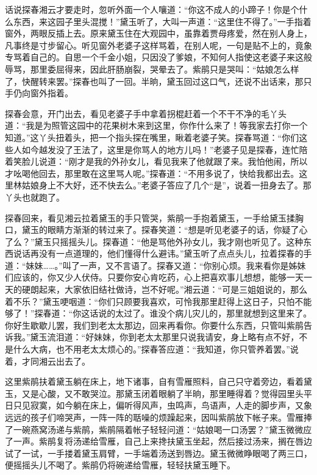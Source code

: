 


\begin{parag}
    话说探春湘云才要走时，忽听外面一个人嚷道：“你这不成人的小蹄子！你是个什么东西，来这园子里头混搅！”黛玉听了，大叫一声道：“这里住不得了。”一手指着窗外，两眼反插上去。原来黛玉住在大观园中，虽靠着贾母疼爱，然在别人身上，凡事终是寸步留心。听见窗外老婆子这样骂着，在别人呢，一句是贴不上的，竟象专骂着自己的。自思一个千金小姐，只因没了爹娘，不知何人指使这老婆子来这般辱骂，那里委屈得来，因此肝肠崩裂，哭晕去了。紫鹃只是哭叫：“姑娘怎么样了，快醒转来罢。”探春也叫了一回。半晌，黛玉回过这口气，还说不出话来，那只手仍向窗外指着。
\end{parag}


\begin{parag}
    探春会意，开门出去，看见老婆子手中拿着拐棍赶着一个不干不净的毛丫头道：“我是为照管这园中的花果树木来到这里，你作什么来了！等我家去打你一个知道。”这丫头扭着头，把一个指头探在嘴里，瞅着老婆子笑。探春骂道：“你们这些人如今越发没了王法了，这里是你骂人的地方儿吗！”老婆子见是探春，连忙陪着笑脸儿说道：“刚才是我的外孙女儿，看见我来了他就跟了来。我怕他闹，所以才吆喝他回去，那里敢在这里骂人呢。”探春道：“不用多说了，快给我都出去。这里林姑娘身上不大好，还不快去么。”老婆子答应了几个“是”，说着一扭身去了。那丫头也就跑了。
\end{parag}


\begin{parag}
    探春回来，看见湘云拉着黛玉的手只管哭，紫鹃一手抱着黛玉，一手给黛玉揉胸口，黛玉的眼睛方渐渐的转过来了。探春笑道：“想是听见老婆子的话，你疑了心了么？”黛玉只摇摇头儿。探春道：“他是骂他外孙女儿，我才刚也听见了。这种东西说话再没有一点道理的，他们懂得什么避讳。”黛玉听了点点头儿，拉着探春的手道：“妹妹……。”叫了一声，又不言语了。探春又道：“你别心烦。我来看你是姊妹们应该的，你又少人伏侍。只要你安心肯吃药，心上把喜欢事儿想想，能够一天一天的硬朗起来，大家依旧结社做诗，岂不好呢。”湘云道：“可是三姐姐说的，那么着不乐？”黛玉哽咽道：“你们只顾要我喜欢，可怜我那里赶得上这日子，只怕不能够了！”探春道：“你这话说的太过了。谁没个病儿灾儿的，那里就想到这里来了。你好生歇歇儿罢，我们到老太太那边，回来再看你。你要什么东西，只管叫紫鹃告诉我。”黛玉流泪道：“好妹妹，你到老太太那里只说我请安，身上略有点不好，不是什么大病，也不用老太太烦心的。”探春答应道：“我知道，你只管养着罢。”说着，才同湘云出去了。
\end{parag}


\begin{parag}
    这里紫鹃扶着黛玉躺在床上，地下诸事，自有雪雁照料，自己只守着旁边，看着黛玉，又是心酸，又不敢哭泣。那黛玉闭着眼躺了半晌，那里睡得着？觉得园里头平日只见寂寞，如今躺在床上，偏听得风声，虫鸣声，鸟语声，人走的脚步声，又象远远的孩子们啼哭声，一阵一阵的聒噪的烦躁起来，因叫紫鹃放下帐子来。雪雁捧了一碗燕窝汤递与紫鹃，紫鹃隔着帐子轻轻问道：“姑娘喝一口汤罢？”黛玉微微应了一声。紫鹃复将汤递给雪雁，自己上来搀扶黛玉坐起，然后接过汤来，搁在唇边试了一试，一手搂着黛玉肩臂，一手端着汤送到唇边。黛玉微微睁眼喝了两三口，便摇摇头儿不喝了。紫鹃仍将碗递给雪雁，轻轻扶黛玉睡下。
\end{parag}


